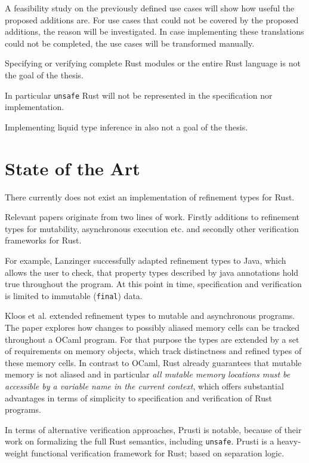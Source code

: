 \documentclass[11pt]{article}
\newcommand{\code}[1]{\texttt{#1}}
\begin{document}
A feasibility study on the previously defined use cases will show how useful the proposed additions are. For use cases that could not be covered by the proposed additions, the reason will be investigated.
In case implementing these translations could not be completed, the use cases will be transformed manually.

Specifying or verifying complete Rust modules or the entire Rust language is not the goal of the thesis.

In particular \code{unsafe} Rust will not be represented in the specification nor implementation.


Implementing liquid type inference in also not a goal of the thesis.

\section{State of the Art}

There currently does not exist an implementation of refinement types for Rust.

Relevant papers originate from two lines of work. Firstly additions to refinement types for mutability, asynchronous execution etc. and secondly other verification frameworks for Rust.

For example, Lanzinger \cite{lanzinger_property_2021} successfully adapted refinement types to Java, which allows the user to check, that property types described by java annotations hold true throughout the program. At this point in time, specification and verification is limited to immutable (\code{final}) data.

Kloos et al. \cite{kloos_asynchronous_2015} extended refinement types to mutable and asynchronous programs. The paper explores how changes to possibly aliased memory cells can be tracked throughout a OCaml program. For that purpose the types are extended by a set of requirements on memory objects, which track distinctness and refined types of these memory cells. In contrast to OCaml, Rust already guarantees that mutable memory is not aliased and in particular \textit{all mutable memory locations must be accessible by a variable name in the current context}, which offers substantial advantages in terms of simplicity to specification and verification of Rust programs.

In terms of alternative verification approaches, Prusti\cite{astrauskas_leveraging_2019} is notable, because of their work on formalizing the full Rust semantics, including \code{unsafe}. Prusti is a heavy-weight functional verification framework for Rust; based on separation logic.
\end{document}
